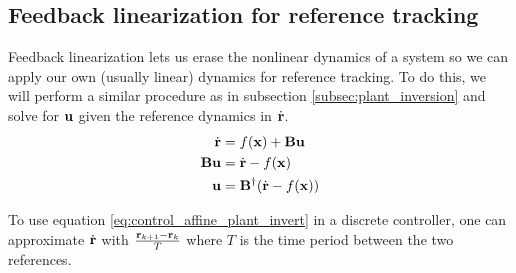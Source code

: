 \subsection{Feedback linearization for reference tracking}

Feedback linearization lets us erase the nonlinear dynamics of a system so we
can apply our own (usually linear) dynamics for \gls{reference} tracking. To do
this, we will perform a similar procedure as in subsection
\ref{subsec:plant_inversion} and solve for $\mathbf{u}$ given the \gls{reference}
dynamics in $\dot{\mathbf{r}}$.
\begin{align}
  \dot{\mathbf{r}} &= f(\mathbf{x}) + \mathbf{B}\mathbf{u} \nonumber \\
  \mathbf{B}\mathbf{u} &= \dot{\mathbf{r}} - f(\mathbf{x}) \nonumber \\
  \mathbf{u} &= \mathbf{B}^\dagger (\dot{\mathbf{r}} - f(\mathbf{x}))
    \label{eq:control_affine_plant_invert}
\end{align}
\begin{remark}
  To use equation \eqref{eq:control_affine_plant_invert} in a discrete
  controller, one can approximate $\dot{\mathbf{r}}$ with
  $\frac{\mathbf{r}_{k + 1} - \mathbf{r}_k}{T}$ where $T$ is the time period between
  the two \glspl{reference}.
\end{remark}
